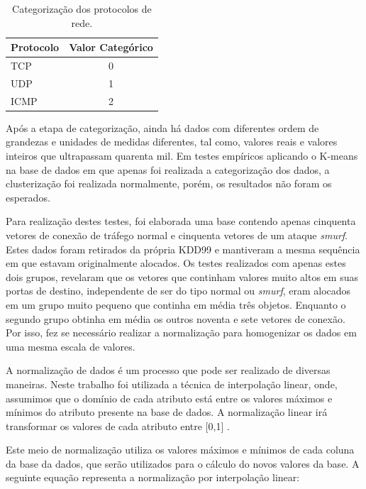 \begin{table}[h]
\centering
\caption{Categorização dos protocolos de rede.}
\vspace{0.5cm}
\begin{tabular}{|l|c|}
\hline
\textbf{Protocolo} & \textbf{Valor Categórico}\\
\hline
TCP & 0\\
\hline
UDP & 1\\
\hline
ICMP & 2\\
\hline
\end{tabular}
\label{tab4}
\end{table}

\indent Após a etapa de categorização, ainda há dados com diferentes ordem de grandezas e unidades de medidas diferentes, tal como, valores reais e valores inteiros que ultrapassam quarenta mil. Em testes empíricos aplicando o K-means na base de dados em que apenas foi realizada a categorização dos dados, a clusterização foi realizada normalmente, porém, os resultados não foram os esperados.

\indent Para realização destes testes, foi elaborada uma base contendo apenas cinquenta vetores de conexão de tráfego normal e cinquenta vetores de um ataque \textit{smurf}. Estes dados foram retirados da própria KDD99 e mantiveram a mesma sequência em que estavam originalmente alocados. Os testes realizados com apenas estes dois grupos, revelaram que os vetores que continham valores muito altos em suas portas de destino, independente de ser do tipo normal ou \textit{smurf}, eram alocados em um grupo muito pequeno que continha em média três objetos. Enquanto o segundo grupo obtinha em média os outros noventa e sete vetores de conexão. Por isso, fez se necessário realizar a normalização para homogenizar os dados em uma mesma escala de valores.

\indent A normalização de dados é um processo que pode ser realizado de diversas maneiras. Neste trabalho foi utilizada a técnica de interpolação linear, onde, assumimos que o domínio de cada atributo está entre os valores máximos e mínimos do atributo presente na base de dados. A normalização linear irá transformar os valores de cada atributo entre [0,1] \cite{goldschmidt2005} \cite{Silva2007}.

\indent Este meio de normalização utiliza os valores máximos e mínimos de cada coluna da base da dados, que serão utilizados para o cálculo do novos valores da base. A seguinte equação representa a normalização por interpolação linear:

